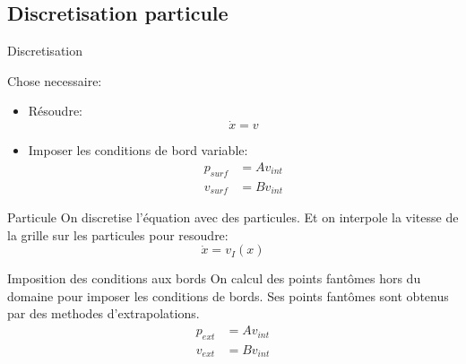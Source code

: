 \subsection{Discretisation particule}
\begin{frame}{Discretisation}

\begin{block}{Chose necessaire:}
 \begin{itemize}
  \item Résoudre:
  \begin{equation*}
   \dot{x}=v
  \end{equation*}
  \item Imposer les conditions de bord variable:
   \begin{align*}
 p_{surf}&=Av_{int}\\
 v_{surf}&=Bv_{int}
\end{align*}
 \end{itemize}

\end{block}

\begin{block}{Particule}
 On discretise l'équation avec des particules.
 Et on interpole la vitesse de la grille sur les particules pour resoudre:
   \begin{equation*}
   \dot{x}=v_{I}(x)
  \end{equation*}
\end{block}
\begin{block}{Imposition des conditions aux bords}
On calcul des points fantômes hors du domaine pour imposer les conditions de bords.
Ses points fantômes sont obtenus par des methodes d'extrapolations.
\begin{align*}
 p_{ext}&=Av_{int}\\
 v_{ext}&=Bv_{int}
\end{align*}
\end{block}

\end{frame}

